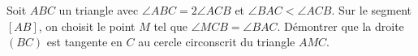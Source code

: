 Soit $ABC$ un triangle avec $\angle ABC = 2\angle ACB$ et
$\angle BAC < \angle ACB$. Sur le segment $[AB]$, on choisit le point $M$ tel
que $\angle MCB = \angle BAC$. Démontrer que la droite $(BC)$ est tangente en
$C$ au cercle circonscrit du triangle $AMC$.

